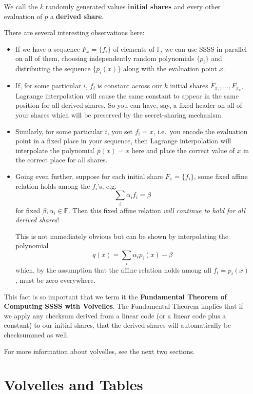 \documentclass[letterpaper]{article}
\begin{document}
We call the $k$ randomly generated values \textbf{initial shares} and
every other evaluation of $p$ a \textbf{derived share}.

There are several interesting observations here:
\begin{itemize}
\item If we have a sequence $F_x = \{f_i\}$ of elements of $\mathbb{F}$, we can use
SSSS in parallel on all of them, choosing independently random polynomials
$\{p_i\}$ and distributing the sequence $\{p_i(x)\}$ along with the evaluation
point $x$.
\item If, for some particular $i$, $f_i$ is constant across our $k$ initial
shares $F_{x_1},\ldots,F_{x_k}$, Lagrange interpolation will cause the same
constant to appear in the same position for all derived shares. So you can
have, say, a fixed header on all of your shares which will be preserved by
the secret-sharing mechanism.
\item Similarly, for some particular $i$, you set $f_i=x$, i.e.~you encode the
evaluation point in a fixed place in your sequence, then Lagrange interpolation
will interpolate the polynomial $p(x) = x$ here and place the correct value
of $x$ in the correct place for all shares.
\item Going even further, suppose for each initial share $F_x=\{f_i\}$, some fixed
affine relation holds among the $f_i$'s, e.g.
\[ \sum_i \alpha_i f_i = \beta \]
for fixed $\beta,\alpha_i\in \mathbb{F}$. Then this fixed affine relation
\emph{will continue to hold for all derived shares}!

This is not immediately obvious but can be shown by interpolating the polynomial
		\[ q(x) = \sum_i \alpha_i p_i(x) - \beta \]
which, by the assumption that the affine relation holds among all $f_i = p_i(x)$, must be zero everywhere.
\end{itemize}

This fact is so important that we term it the \textbf{Fundamental Theorem of
Computing SSSS with Volvelles}. The Fundamental Theorem implies that if we
apply any checksum derived from a linear code (or a linear code plus a
constant) to our initial shares, that the derived shares will automatically
be checksummed as well.

For more information about volvelles, see the next two sections.

\section{Volvelles and Tables}
\end{document}
